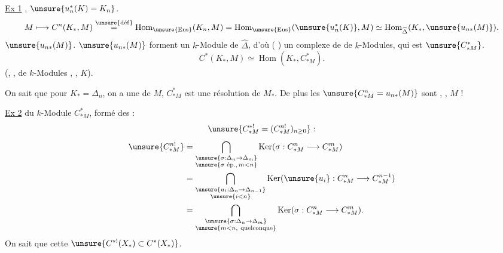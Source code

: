 \uline{Ex 1} ,  
$\unsure{u_n^*(K)=K_n}$.
\[
M\longmapsto C^n(K_*,M)\overset{\unsure{\mathrm{d\acute{e}f}}}{=}
\operatorname{Hom}_{\unsure{\mathrm{Ens}}}(K_n,M)
=\operatorname{Hom}_{\unsure{\mathrm{Ens}}}(\unsure{u_n^*(K)},M)
\simeq \operatorname{Hom}_{\widehat{\Delta}}(K_*,\unsure{u_{n*}(M)}).
\]
 $\unsure{u_{n*}(M)}$.
 $\unsure{u_{n*}(M)}$
forment un $k$-Module  de $\widehat{\Delta}$, d'où
( )
un complexe de  de $k$-Modules, qui est
$\unsure{C_{*M}^*}$. 
\[
C^*(K_*,M)\simeq\operatorname{Hom}(K_*,C_{*M}^*).
\]
(, , de $k$-Modules ,
,   $K$).

On sait que pour $K_*=\Delta_n$, on a une 
de $M$,  $C_{*M}^*$ est une résolution de $M_*$.
De plus les $\unsure{C_{*M}^n=u_{n*}(M)}$ sont ,
, $M$  !

\uline{Ex 2} 
du $k$-Module  $C_{*M}^*$, formé des 
:
\[
\unsure{C_{*M}^{*!}=(C_{*M}^{n!})_{n\geq0}}:
\]
\[
\begin{aligned}
\unsure{C_{*M}^{n!}}
&=\bigcap_{\substack{\unsure{\sigma:\Delta_n\to\Delta_m}\\
\unsure{\sigma\text{ ép.},\,m<n}}}
\operatorname{Ker}(\sigma:C_{*M}^n\longrightarrow C_{*M}^m)\\
&=\bigcap_{\substack{\unsure{u_i:\Delta_n\to\Delta_{n-1}}\\
\unsure{i<n}}}
\operatorname{Ker}(\unsure{u_i}:C_{*M}^n\longrightarrow C_{*M}^{n-1})\\
&=\bigcap_{\substack{\unsure{\sigma:\Delta_n\to\Delta_m}\\
\unsure{m<n,\ \text{quelconque}}}}
\operatorname{Ker}(\sigma:C_{*M}^n\longrightarrow C_{*M}^m).
\end{aligned}
\]
On sait que cette   
   
   
$\unsure{C^{*!}(X_*)\subset C^*(X_*)}$.

